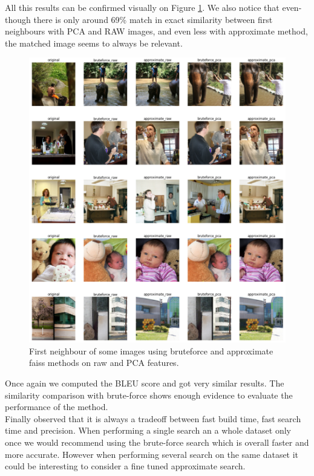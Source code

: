 \documentclass[a4paper]{article}
\begin{document}
All this results can be confirmed visually on Figure \ref{fig:visual-faiss}. We also notice that even-though there is only around 69\% match in exact similarity between first neighbours with PCA and RAW images, and even less with approximate method, the matched image seems to always be relevant. \\

\begin{figure}[h]
	\includegraphics[width=\textwidth]{visual-faiss}
	\caption{First neighbour of some images using bruteforce and approximate faiss methods on raw and PCA features.}
	\label{fig:visual-faiss}
\end{figure}

Once again we computed the BLEU score and got very similar results. The similarity comparison with brute-force shows enough evidence to evaluate the performance of the method. \\

Finally observed that it is always a tradeoff between fast build time, fast search time and precision. When performing a single search an a whole dataset only once we would recommend using the brute-force search which is overall faster and more accurate. However when performing several search on the same dataset it could be interesting to consider a fine tuned approximate search.
\end{document}
